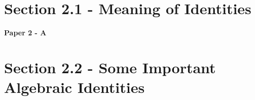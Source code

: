 \documentclass[12pt, a4paper]{article}
\begin{document}
\section*{Section 2.1 - Meaning of Identities}\label{section:2-2-1}

\textbf{Paper 2 - A}
\begin{enumx}[label=\arabic*.,start=1]
\item {}\label{DSE2012S-CoreP2-Q04} 
\item {}\label{DSE2012P-CoreP2-Q04} 
\item {}\label{DSE2012-CoreP2-Q03} 
\item {}\label{DSE2013-CoreP2-Q08} 
\item {}\label{DSE2014-CoreP2-Q03} 
\item {}\label{DSE2015-CoreP2-Q05} 
\item {}\label{DSE2017-CoreP2-Q08} 
\item {}\label{DSE2019-CoreP2-Q04} 
\item {}\label{DSE2022-CoreP2-Q03} 
\item {}\label{DSE2023-CoreP2-Q05} 
\item {}\label{DSE2024-CoreP2-Q06} 
\item {}\label{DSE2024-CoreP2-Q07} 
\end{enumx}




\section*{Section 2.2 - Some Important Algebraic Identities}\label{section:2-2-2}
\end{document}
